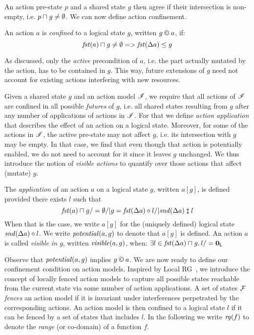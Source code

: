 An action pre-state $p$ and a shared state $g$ then agree if their intersection is non-empty, i.e. $p \sqcap_{} g \not= \emptyset$. We can now define action confinement.
%
%
\begin{definition}\label{def:actconf}
An action $a$ is \emph{confined} to a logical state $g$, written $g\containI a$, if:
%
\[
	\mathit{fst}(a)\sqcap_{} g \neq\emptyset => \mathit{fst}(\Delta {a})\leq g 
\]
\end{definition}
%
As discussed, only the \emph{active} precondition of $a$, i.e. the part actually mutated by the action, has to be contained in $g$. This way, future extensions of $g$ need not account for existing actions interfering with new resources.

Given a shared state $g$ and an action model $\mathscr{I}$, we require that all actions of $\mathscr{I}$ are confined in all possible \emph{futures} of $g$, i.e. all shared states resulting from $g$ after any number of applications of actions in $\mathscr{I}$. For that we define \emph{action application} that describes the effect of an action on a logical state. Moreover, for some of the actions in $\mathscr{I}$, the active pre-state may not affect $g$, i.e. its intersection with $g$ may be empty. In that case, we find that even though that action is potentially enabled, we do not need to account for it since it leaves $g$ unchanged. We thus introduce the notion of \emph{visible actions} to quantify over those actions that affect (mutate) $g$. 
%
\begin{definition}\label{def:actionApplication}
The \emph{application} of an action $a$ on a logical state $g$, written $a[g]$, is defined provided there exists $l$ such that
%
\[
	\mathit{fst}(a) \sqcap_{} g /=\emptyset /|
	g = \mathit{fst}(\Delta {a}) \circ l /|
	\mathit{snd}(\Delta {a})\mathrel{\sharp} l
\]
%
When that is the case, we write $a[g]$ for the (uniquely defined) logical state $\mathit{snd}(\Delta {a})\circ l$. We write $\mathit{potential}(a,g)$ to denote that $a[g]$ is defined.
An action $a$ is called \emph{visible in $g$}, written $\mathit{visible}(a,g)$, when:
%
\quad
$
	\exists l \in \mathit{fst}(\Delta {a})\sqcap_{} g.\, l /= \mathbf{0}_{\mathsf{L}}
$
%
%
\end{definition}
%
Observe that $\mathit{potential}(a,g)$ implies $g\containI a$.  
%
%
We are now ready to define our confinement condition on action models. Inspired by Local RG~\cite{lrg}, we introduce the concept of locally fenced action models to capture all possible states reachable from the current state via some number of action applications. A set of states $\mathcal{F}_{}$ \emph{fences} an action model if it is invariant under interferences perpetrated by the corresponding actions. An action model is then confined to a logical state $l$ if it can be fenced by a set of states that includes $l$. In the following we write $\mathit{rg}(f)$ to denote the \emph{range} (or co-domain) of a function $f$.
